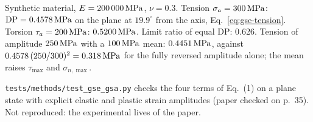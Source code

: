  Synthetic material, $E=200\,000\,\mathrm{MPa}$, $\nu=0.3$. Tension $\sigma_a=300\,\mathrm{MPa}$:
$\mathrm{DP}=0.4578\,\mathrm{MPa}$ on the plane at $19.9^\circ$ from the axis, Eq.~\eqref{eq:gse-tension}.
Torsion $\tau_a=200\,\mathrm{MPa}$: $0.5200\,\mathrm{MPa}$. Limit ratio of equal DP: 0.626. Tension of amplitude
$250\,\mathrm{MPa}$ with a $100\,\mathrm{MPa}$ mean: $0.4451\,\mathrm{MPa}$, against $0.4578\,(250/300)^2=0.318\,\mathrm{MPa}$ for the
fully reversed amplitude alone; the mean raises $\tau_{\max}$ and $\sigma_{n,\max}$.

 \texttt{tests/methods/test\_gse\_gsa.py} checks the four terms of Eq.~(1) on a
plane state with explicit elastic and plastic strain amplitudes (paper checked on p.~35). Not
reproduced: the experimental lives of the paper.
